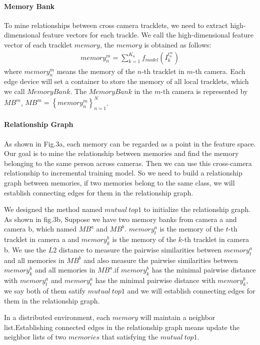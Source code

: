 \documentclass{article}
\begin{document}
\paragraph{Memory Bank}To mine relationships between cross camera tracklets, we need to extract high-dimensional feature vectors for each trackle. We call the high-dimensional feature vector of each tracklet $memory$, the $memory$ is obtained as follows:
\begin{equation}
\begin{aligned}
memory_{n}^{m} = \sum_{k=1}^{K_{n}}f_{model}(I_{k}^{t_{n}^{m}})
\end{aligned}
\end{equation}
where $memory_{n}^{m}$ means the memory of the $n$-th tracklet in $m$-th camera. Each edge device will set a container to store the memory of all local tracklets, which we call $Memory Bank$. The $Memory Bank$ in the $m$-th camera is represented by $MB^{m}$, $MB^{m} = \left \{ memory_{n}^{m} \right \}_{n=1}^{N}$.
\paragraph{Relationship Graph}As shown in Fig.3a, each memory can be regarded as a point in the feature space. Our goal is to mine the relationship between memories and find the memory belonging to the same person across cameras. Then we can use this cross-camera relationship to incremental training model. So we need to build a relationship graph between memories, if two memories belong to the same class, we will establish connecting edges for them in the relationship graph.


We designed the method named $mutual \ top1$ to initialize the relationship graph. As shown in fig.3b, Suppose we have two memory banks from camera a and camera b, which named $MB^{a}$ and $MB^{b}$. $memory_{t}^{a}$ is the memory of the $t$-th tracklet in camera a and $memory_{k}^{b}$ is the memory of the $k$-th tracklet in camera b. We use the $L2$ distance to measure the pairwise similarities between $memory_{t}^{a}$ and all memories in $MB^{b}$ and also measure the pairwise similarities between $memory_{k}^{b}$ and all memories in $MB^{a}$.if $memory_{k}^{b}$ has the  minimal pairwise distance with $memory_{t}^{a}$ and  $memory_{t}^{a}$ has the minimal pairwise distance with $memory_{k}^{b}$, we say both of them satify $mutual \ top1$ and we will establish connecting edges for them in the relationship graph.

In a distributed environment, each $memory$ will maintain a neighbor list.Establishing connected edges in the relationship graph means update the neighbor lists of two $memories$ that satisfying the $mutual \ top1$.
\end{document}
